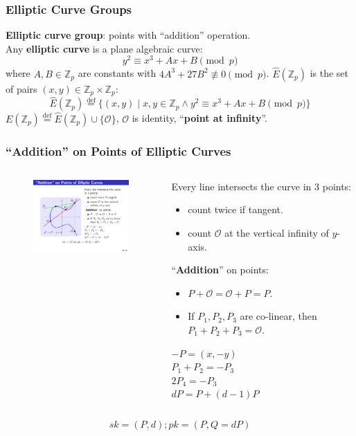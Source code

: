 \begin{frame}\frametitle{Elliptic Curve Groups}
\textbf{Elliptic curve group}: points with ``addition'' operation.\\
Any \textbf{elliptic curve} is a plane algebraic curve:
\[ y^2 \equiv x^3 + Ax + B \pmod p\]
where $A,B \in \mathbb{Z}_p$ are constants with $4A^3 + 27B^2\not \equiv 0 \pmod p$.
$\hat{E}(\mathbb{Z}_p)$ is the set of pairs $(x,y) \in \mathbb{Z}_p \times \mathbb{Z}_p$:
\[ \hat{E}(\mathbb{Z}_p) \overset{\text{def}}{=} \{(x,y) \mid x,y\in \mathbb{Z}_p \land y^2 \equiv x^3 + Ax + B \pmod p \}\]
$E(\mathbb{Z}_p) \overset{\text{def}}{=} \hat{E}(\mathbb{Z}_p)\cup \{\mathcal{O}\}$, $\mathcal{O}$ is identity, ``\textbf{point at infinity}''.
\end{frame}
\begin{frame}\frametitle{``Addition'' on Points of Elliptic Curves}
\begin{columns}
\begin{column}{5cm}
\begin{figure}
\begin{center}
%
\includegraphics[width=50mm]{pic/ecc.pdf} 
\end{center}
\end{figure}
\end{column}
\begin{column}{5cm}
Every line intersects the curve in 3 points:
\begin{itemize}
\item count twice if tangent.
\item count $\mathcal{O}$ at the vertical infinity of $y$-axis.
\end{itemize}
``\textbf{Addition}'' on points:
\begin{itemize}
\item $P+\mathcal{O} = \mathcal{O} + P = P$.
\item If $P_1, P_2, P_3$ are co-linear, then $P_1 + P_2 + P_3 = \mathcal{O}$.
\end{itemize}
$-P=(x,-y)$\\
$P_1 + P_2 = -P_3$\\
$2P_4=-P_3$\\
$dP = P + (d-1)P$
\end{column}
\end{columns}
\[sk = (P,d); pk = (P,Q=dP)\]
\end{frame}
